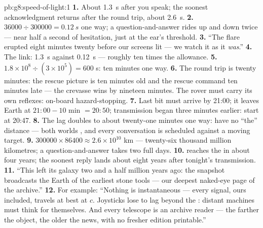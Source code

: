\begin{solution}{pb:g8:speed-of-light:1}
\textbf{1.} About \qty{1.3}{s} after you speak; the soonest
acknowledgment returns after the round trip, about
\qty{2.6}{s}.
\textbf{2.} $36000 \div 300000 = \qty{0.12}{s}$ one way; a
question-and-answer rides up and down twice --- near half a
second of hesitation, just at the ear's threshold.
\textbf{3.} ``The flare erupted eight minutes twenty before
our screens lit --- we watch it as it \emph{was}.''
\textbf{4.} The  link: \qty{1.3}{s} against \qty{0.12}{s}
--- roughly ten times the allowance.
\textbf{5.} $1.8 \times 10^{8} \div (3 \times 10^{5}) = 600$
s: ten minutes one way.
\textbf{6.} The round trip is twenty minutes: the rescue
picture is ten minutes old and the rescue command ten minutes
late --- the crevasse wins by nineteen minutes. The rover
must carry its own reflexes: on-board hazard-stopping.
\textbf{7.} Last bit must arrive by 21:00; it leaves Earth at
$21{:}00 - 10$ min $= 20{:}50$; transmission began three
minutes earlier: start at 20:47.
\textbf{8.} The lag doubles to about twenty-one minutes one
way:  have no ``the'' distance --- both worlds ,
and every conversation is scheduled against a moving target.
\textbf{9.} $300000 \times 86400 \approx 2.6 \times 10^{10}$
km --- twenty-six thousand million kilometres; a
question-and-answer takes two full days.
\textbf{10.}  reaches the  in about four years; the
soonest reply lands about eight years after tonight's
transmission.
\textbf{11.} ``This  left its galaxy two and a half
million years ago: the snapshot broadcasts the Earth of the
earliest stone tools --- our deepest naked-eye page of the
archive.''
\textbf{12.} For example: ``Nothing is instantaneous ---
every signal, ours included, travels at best at $c$.
Joysticks lose to lag beyond the : distant machines must
think for themselves. And every telescope is an archive
reader --- the farther the object, the older the news, with
no fresher edition printable.''
\end{solution}
